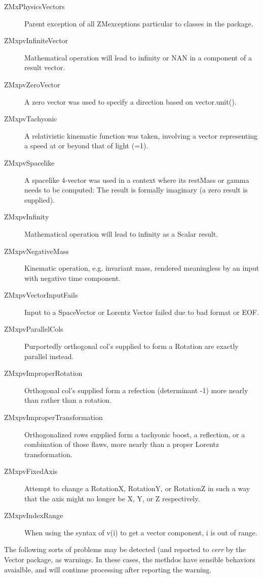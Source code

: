 \documentclass[twoside,12pt]{article}
\begin{document}
\begin{description} 
\item [ZMxPhysicsVectors]
Parent exception of all ZMexceptions
particular to classes in the package.
\item [ZMxpvInfiniteVector]
Mathematical operation will lead
to infinity or NAN in a component
of a result vector.
\item [ZMxpvZeroVector]
A zero vector was used to specify
a direction based on vector.unit().
\item [ZMxpvTachyonic]
A relativistic kinematic function was
taken, involving a vector representing
a speed at or beyond that of light (=1).
\item [ZMxpvSpacelike]
A spacelike 4-vector was used in a
context where its restMass or gamma
needs to be computed:  The result is
formally imaginary (a zero result is
supplied).
\item [ZMxpvInfinity]
Mathematical operation will lead
to infinity as a Scalar result.
\item [ZMxpvNegativeMass]
Kinematic operation, e.g. invariant
mass, rendered meaningless by an input
with negative time component.
\item [ZMxpvVectorInputFails]
Input to a SpaceVector or Lorentz
Vector failed due to bad format or EOF.
\item [ZMxpvParallelCols]
Purportedly orthogonal col's supplied
to form a Rotation are exactly
parallel instead.
\item [ZMxpvImproperRotation]
 Orthogonal col's supplied form a
 refection (determinant -1) more
 nearly than rather than a rotation.
\item [ZMxpvImproperTransformation]
Orthogonalized rows supplied form a
tachyonic boost, a reflection, or
a combination of those flaws,
more nearly than a proper Lorentz
transformation.
\item [ZMxpvFixedAxis]
Attempt to change a RotationX,
RotationY, or RotationZ in such a way
that the axis might no longer be X,
Y, or Z respectively.
\item [ZMxpvIndexRange]
When using the syntax of v(i) to get
a vector component, i is out of range.
\end{description}


The following sorts of problems may be detected (and reported to {\em cerr}
by the Vector package, as warnings.  
In these cases, the methdos have sensible behaviors avaialble, and will continue
processing after reporting the warning.
\end{document}
